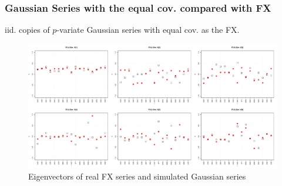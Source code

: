\documentclass{beamer}
\begin{document}
\begin{frame}
  \frametitle{Gaussian Series with the equal cov. compared with FX}
  iid. copies of $p$-variate Gaussian series with equal cov. as the FX.
  \begin{figure}[htb!]
    \centering
    \includegraphics[width=1.0\linewidth]{Gaussian_eigenvectors.pdf}
    \caption{\scriptsize Eigenvectors of real FX series and simulated Gaussian series}
  \end{figure}
\end{frame}
\end{document}
